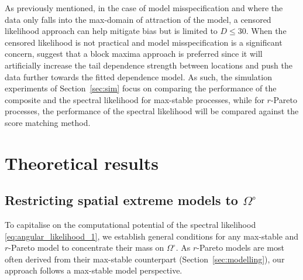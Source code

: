 \documentclass[12pt]{article}
\begin{document}

As previously mentioned, in the case of model misspecification and where the data only falls into the max-domain of attraction of the model, a censored likelihood approach can help mitigate bias \citep{Wadsworth.Tawn:2014, Huser.etal:2016} but is limited to $D\leq 30$. When the censored likelihood is not practical and model misspecification is a significant concern, \citet{Huser.etal:2016} suggest that a block maxima approach is preferred since it will artificially increase the tail dependence strength between locations and push the data further towards the fitted dependence model. 
% 
As such, the simulation experiments of Section~\ref{sec:sim} focus on comparing the performance of the composite and the spectral likelihood for max-stable processes, while for $r$-Pareto processes, the performance of the spectral likelihood will be compared against the score matching method.

\section{Theoretical results}
\label{sec:theory}

\subsection{Restricting spatial extreme models to $\Omega^\circ$}

To capitalise on the computational potential of the spectral likelihood \eqref{eq:angular_likelihood_1}, we establish general conditions for any max-stable and $r$-Pareto model to concentrate their mass on $\Omega^\circ$. As 
$r$-Pareto models are most often derived from their max-stable counterpart (Section~\ref{sec:modelling}), our approach follows a max-stable model perspective.
\end{document}
